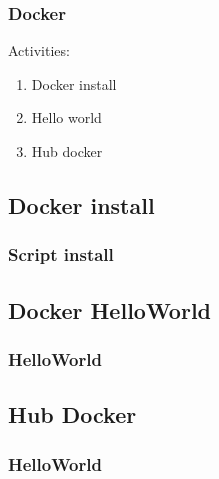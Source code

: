 \documentclass{beamer}
\begin{document}
\begin{frame}\frametitle{Docker} 
 Activities:
\begin{enumerate}
\item
  Docker install 
\item
  Hello world 
\item    
  Hub docker

\end{enumerate}

\end{frame}


\subsection{Docker install} 
\begin{frame}\frametitle{Script install} 
 
\begin{block}
  \lstinstall
\end{block}

\end{frame}



\subsection{Docker HelloWorld} 
\begin{frame}\frametitle{HelloWorld} 
 
\begin{block}
  \lsthelloworld
\end{block}

\end{frame}


\subsection{Hub Docker} 
\begin{frame}\frametitle{HelloWorld} 
 
\begin{block}
  \lstdockerhub
\end{block}

\end{frame}
\end{document}
